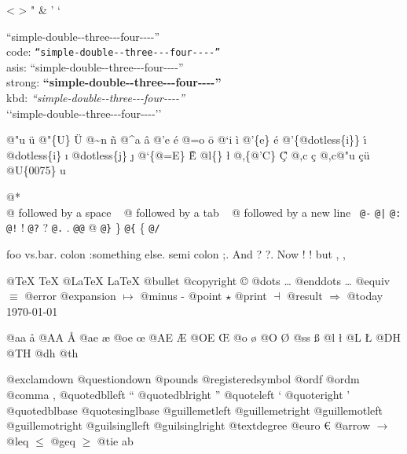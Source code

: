 \documentclass{book}
\begin{document}
<
>
"
\&
'
`

``simple-double{-}{-}three{-}{-}{-}four{-}{-}{-}-''\leavevmode{}\\
code: \texttt{``simple-double{-}{-}three{-}{-}{-}four{-}{-}{-}-''} \leavevmode{}\\
asis: ``simple-double{-}{-}three{-}{-}{-}four{-}{-}{-}-'' \leavevmode{}\\
strong: \textbf{``simple-double{-}{-}three{-}{-}{-}four{-}{-}{-}-''} \leavevmode{}\\
kbd: {\ttfamily\textsl{``simple-double{-}{-}three{-}{-}{-}four{-}{-}{-}-''}} \leavevmode{}\\

`\hbox{}`simple-double-\hbox{}-three{-}{-}{-}four{-}{-}{-}-'\hbox{}'\leavevmode{}\\

%
%
%
%

@"u \"{u} 
@"\{U\} \"{U} 
@\~{}n \~{n}
@\^{}a \^{a}
@'e \'{e}
@=o \={o}
@`i \`{i}
@'\{e\} \'{e}
@'\{@dotless\{i\}\} \'{\i{}} 
@dotless\{i\} \i{}
@dotless\{j\} \j{}
@`\{@=E\} \`{\={E}} 
@l\{\} \l{}
@,\{@'C\} \c{\'{C}}
@,c \c{c}
@,c@"u \c{c}\"{u} \leavevmode{}\\

@U\{0075\} u

@* \leavevmode{}\\
@ followed by a space
\ {}
@ followed by a tab
\ {}
@ followed by a new line
\ {}\texttt{@-} \-{}
\texttt{@|} 
\texttt{@:} \@
\texttt{@!} \@!
\texttt{@?} \@?
\texttt{@.} \@.
\texttt{@@} @
\texttt{@\}} \}
\texttt{@\{} \{
\texttt{@/} 

foo vs.\@ bar. 
colon :\@And something else.
semi colon ;\@.
And ? ?\@.
Now ! !\@@
but , ,\@

@TeX \TeX{}
@LaTeX \LaTeX{}
@bullet \textbullet{}
@copyright \copyright{}
@dots \dots{}\@
@enddots \dots{}
@equiv $\equiv{}$
@error 
@expansion $\mapsto{}$
@minus -
@point $\star{}$
@print $\dashv{}$
@result $\Rightarrow{}$
@today \today{}

@aa \aa{}
@AA \AA{}
@ae \ae{}
@oe \oe{}
@AE \AE{}
@OE \OE{}
@o \o{}
@O \O{}
@ss \ss{}
@l \l{}
@L \L{}
@DH \DH{}
@TH \TH{}
@dh \dh{}
@th \th{}

@exclamdown \textexclamdown{}
@questiondown \textquestiondown{}
@pounds \textsterling{}
@registeredsymbol \circledR{}
@ordf \textordfeminine{}
@ordm \textordmasculine{}
@comma ,
@quotedblleft \textquotedblleft{}
@quotedblright \textquotedblright{}
@quoteleft \textquoteleft{}
@quoteright \textquoteright{}
@quotedblbase \quotedblbase{}
@quotesinglbase \quotesinglbase{}
@guillemetleft \guillemotleft{}
@guillemetright \guillemotright{}
@guillemotleft \guillemotleft{}
@guillemotright \guillemotright{}
@guilsinglleft \guilsinglleft{}
@guilsinglright \guilsinglright{}
@textdegree \textdegree{}
@euro \euro{}
@arrow $\rightarrow{}$
@leq $\leq{}$
@geq $\geq{}$
@tie a\hbox{}b
\end{document}
